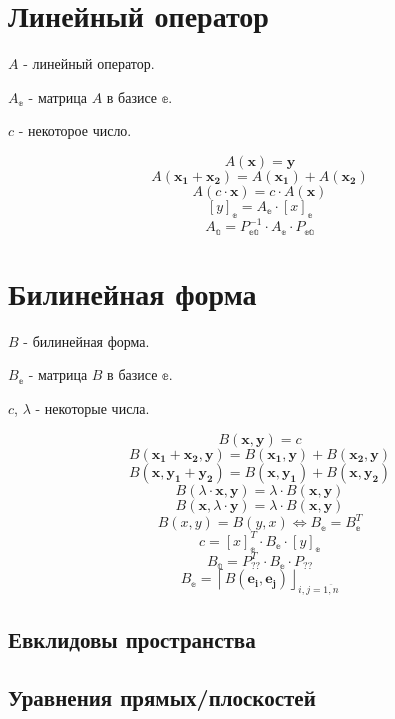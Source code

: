 \section{Линейный оператор}

$A$ - линейный оператор.

$A_\mathbb{e}$ - матрица $A$ в базисе $\mathbb{e}$.

$c$ - некоторое число.
 
$$ A(\boldsymbol{x}) = \boldsymbol{y} $$
$$ A(\boldsymbol{x_1} + \boldsymbol{x_2}) = A(\boldsymbol{x_1}) + A(\boldsymbol{x_2}) $$
$$ A(c\cdot\boldsymbol{x}) = c\cdot A(\boldsymbol{x}) $$
$$ [y]_\mathbb{e} = A_\mathbb{e} \cdot [x]_\mathbb{e} $$
$$ A_\mathbb{a} = P_\mathbb{ea}^{-1} \cdot A_\mathbb{e} \cdot P_\mathbb{ea} $$

\section{Билинейная форма}

$B$ - билинейная форма.

$B_\mathbb{e}$ - матрица $B$ в базисе $\mathbb{e}$.

$c$, $\lambda$ - некоторые числа.

$$ B(\boldsymbol{x}, \boldsymbol{y}) = c$$
$$ B(\boldsymbol{x_1} + \boldsymbol{x_2}, \boldsymbol{y}) = B(\boldsymbol{x_1}, \boldsymbol{y}) + B(\boldsymbol{x_2}, \boldsymbol{y}) $$
$$ B(\boldsymbol{x}, \boldsymbol{y_1} + \boldsymbol{y_2}) = B(\boldsymbol{x}, \boldsymbol{y_1}) + B(\boldsymbol{x}, \boldsymbol{y_2}) $$
$$ B(\lambda\cdot \boldsymbol{x}, \boldsymbol{y}) =  \lambda\cdot B(\boldsymbol{x}, \boldsymbol{y})$$
$$ B(\boldsymbol{x}, \lambda\cdot \boldsymbol{y}) =  \lambda\cdot B(\boldsymbol{x}, \boldsymbol{y})$$
$$ B(x, y) = B(y, x) \Leftrightarrow B_\mathbb{e} = B_\mathbb{e}^T $$
$$ c = [x]_\mathbb{e}^T \cdot B_\mathbb{e} \cdot [y]_\mathbb{e} $$
$$ B_\mathbb{a} = P_\mathbb{??}^T \cdot B_\mathbb{e} \cdot P_\mathbb{??} $$
$$ B_\mathbb{e} = \left\lceil B(\boldsymbol{e_i},\boldsymbol{e_j})\right\rfloor_{i,j=\overline{1,n}} $$

\subsection{Евклидовы пространства}
 

\subsection{Уравнения прямых/плоскостей}


